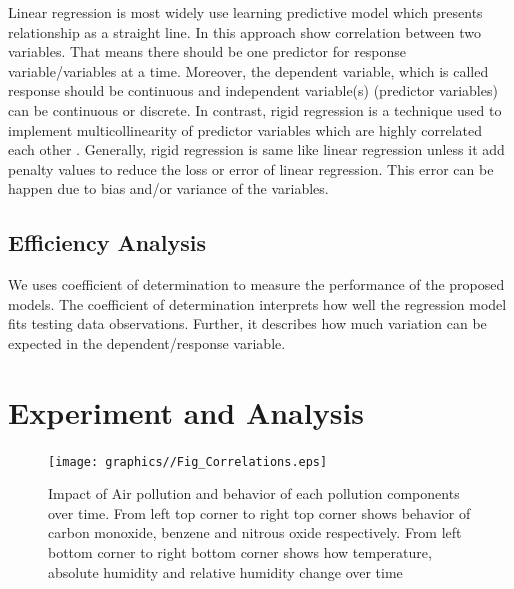 Linear regression is most widely use learning predictive model 
which presents relationship as a straight line.
In this approach show correlation between two variables.
That means there should be one predictor for response variable/variables at a time.
Moreover, the dependent variable, which is called 
response should be continuous and independent 
variable(s) (predictor variables) can be continuous or discrete. 
In contrast, rigid regression is a technique used 
to implement multicollinearity of predictor variables 
which are highly correlated each other \cite{dong2016moving}.
Generally, rigid regression is same like 
linear regression unless it add penalty values 
to reduce the loss or error of linear regression.
This error can  be happen due to bias and/or variance of the variables.

\subsection{Efficiency Analysis}
We uses coefficient of determination to measure the performance of the proposed models. 
The coefficient of determination interprets 
how well the regression model fits testing data observations.
Further, it describes how much variation 
can be expected in the dependent/response variable.

\section{Experiment and Analysis} \label{sec-experiment}

\begin{figure}
  \texttt{[image: graphics//Fig\_Correlations.eps]}
  \caption{Impact of Air pollution and behavior of each pollution
  components over time. From left top corner to right top corner
  shows behavior of carbon monoxide, benzene and nitrous oxide
  respectively. From left bottom corner to right bottom corner shows
  how temperature, absolute humidity and relative humidity change
  over time} \label{Fig_Predictor_correlation}
\end{figure}


